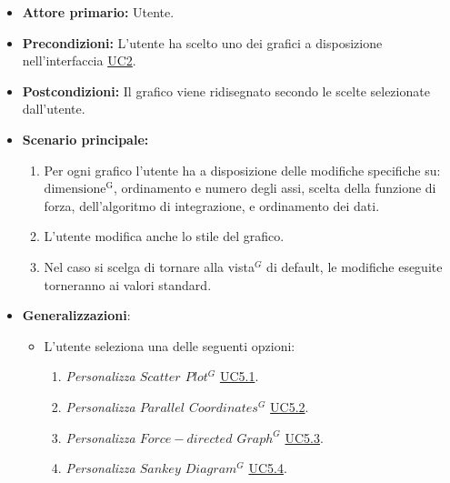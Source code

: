 \begin{itemize}
	\item \textbf{Attore primario:} Utente.
	\item \textbf{Precondizioni:} L'utente ha scelto uno dei grafici a disposizione nell'interfaccia \hyperref[sec:UC2]{UC2}.
	\item \textbf{Postcondizioni:} Il grafico viene ridisegnato secondo le scelte selezionate dall'utente.
	\item \textbf{Scenario principale:}
	\begin{enumerate}
		\item Per ogni grafico l'utente ha a disposizione delle modifiche specifiche su: ${\mathrm{dimensione^{G}}}$, ordinamento e numero degli assi, scelta della funzione di forza, dell'algoritmo di integrazione, e ordinamento dei dati.
    		\item L'utente modifica anche lo stile del grafico.
    		\item Nel caso si scelga di tornare alla vista$^{G}$ di default, le modifiche eseguite torneranno ai valori standard.
    \end{enumerate}
    \item \textbf{Generalizzazioni}:
    \begin{itemize}
        \item L'utente seleziona una delle seguenti opzioni:
                \begin{enumerate}
                    \item \textit{Personalizza $Scatter$ $Plot^{G}$} \hyperref[sec:UC5.1]{UC5.1}.
                    \item \textit{Personalizza $Parallel$ $Coordinates^{G}$} \hyperref[sec:UC5.2]{UC5.2}.
                    \item \textit{Personalizza $Force-directed$ $Graph^{G}$} \hyperref[sec:UC5.3]{UC5.3}.
                    \item \textit{Personalizza $Sankey$ $Diagram^{G}$} \hyperref[sec:UC5.4]{UC5.4}.
                \end{enumerate}
    \end{itemize} 
\end{itemize}

\newpage
